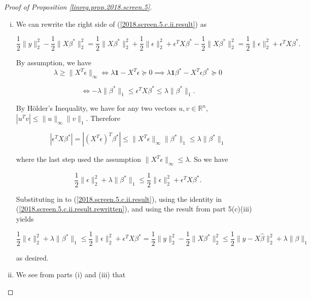 \begin{proof}[Proof of Proposition \ref{linreg.prop.2018.screen.5}]
\begin{enumerate}[(a)]
\begin{enumerate}[(i)]
\item 



We can rewrite the right side of (\ref{2018.screen.5.c.ii.result}) as 

\begin{equation}\label{2018.screen.5.c.ii.result.rewritten}
\frac{1}{2} \lVert y \rVert_2^2 - \frac{1}{2} \lVert X \beta^* \rVert_2^2 = \frac{1}{2} \lVert X \beta^* \rVert_2^2 + \frac{1}{2} \lVert \epsilon \rVert_2^2 + \epsilon^T X \beta^* - \frac{1}{2} \lVert X \beta^* \rVert_2^2  =  \frac{1}{2} \lVert \epsilon \rVert_2^2 + \epsilon^T X \beta^*. 
\end{equation}

By assumption, we have 
\[
\lambda \geq \lVert X^T \epsilon \rVert_\infty \iff \lambda \boldsymbol{1}  - X^T \epsilon \succeq 0 \implies \lambda \boldsymbol{1} \beta^*  - X^T \epsilon \beta^* \succeq 0 
\]

\[
\iff - \lambda \lVert \beta^* \rVert_1 \leq \epsilon^T X \beta^* \leq \lambda \lVert \beta^* \rVert_1.
\]

By H\"{o}lder's Inequality, we have for any two vectors \(u, v \in \mathbb{R}^n\), \( | u^Tv | \leq \lVert u \rVert_\infty \lVert v \rVert_1\). Therefore

\[
| \epsilon^T X \beta^*| = | (X^T \epsilon)^T \beta^* | \leq \lVert X^T \epsilon \rVert_\infty \lVert \beta^* \rVert_1 \leq \lambda \lVert \beta^* \rVert_1
\]

where the last step used the assumption \(\lVert X^T \epsilon \rVert_\infty \leq \lambda\). So we have 

\[
 \frac{1}{2} \lVert \epsilon \rVert_2^2 +\lambda \lVert \beta^* \rVert_1 \leq \frac{1}{2} \lVert \epsilon \rVert_2^2 + \epsilon^T X \beta^* .
\]

Substituting in to (\ref{2018.screen.5.c.ii.result}), using the identity in (\ref{2018.screen.5.c.ii.result.rewritten}), and using the result from part 5(c)(iii) yields

\[
 \frac{1}{2} \lVert \epsilon \rVert_2^2 +\lambda \lVert \beta^* \rVert_1 \leq \frac{1}{2} \lVert \epsilon \rVert_2^2 + \epsilon^T X \beta^* = \frac{1}{2} \lVert y \rVert_2^2 - \frac{1}{2} \lVert X \beta^* \rVert_2^2  \leq \frac{1}{2} \lVert y - X \hat{\beta} \rVert_2^2 + \lambda \lVert \beta \rVert_1 
\]

as desired.

\item  We see from parts (i) and (iii) that


\end{enumerate}
\end{enumerate}
\end{proof}
